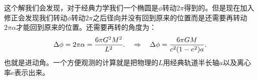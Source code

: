 \bigskip
{}

这个解我们会发现，对于经典力学我们一个椭圆是$ \phi $转动$ 2 \pi $得到的。但是现在加入修正会发现我们转动$ \phi
$转动$ 2 \pi $之后径向并没有回到原来的位置而是还需要再转动$ 2 \pi \alpha $才能回到原来的位置。还需要再转的角度为：
\begin{align}
  \Delta \phi = 2 \pi \alpha = \frac{6 \pi G^2 M^2}{L^2}.\quad
  \Rightarrow \quad \large\Delta\phi=\frac{6\pi GM}{c^2(1-e^2)a}.
\end{align}
也就是进动角。一个方便观测的计算就是把物理的$ L $用经典轨道半长轴$ a $以及离心率$ e $表示出来。
